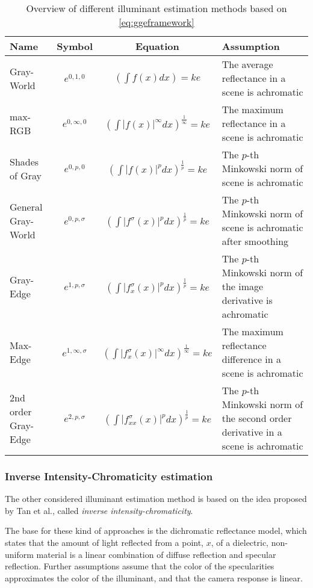 \begin{table}[h!]
\caption{Overview of different illuminant estimation methods based on \ref{eq:ggeframework}}
\centering
\small
\begin{tabular}{l c c p{4.5cm}} 
\hline\hline 
Name & Symbol & Equation & Assumption \\ [0.5ex]
\hline 
Gray-World & $e^{0, 1, 0}$ & $(\int f(x) dx) = k e$ & The average reflectance in a scene is achromatic \\
max-RGB & $e^{0, \infty, 0}$ & $(\int |f(x)|^{\infty} dx)^{\frac{1}{\infty}} = k e$ & The maximum reflectance in a scene is achromatic \\
Shades of Gray & $e^{0, p, 0}$ & $(\int |f(x)|^{p} dx)^{\frac{1}{p}} = k e$ & The $p$-th Minkowski norm of scene is achromatic \\
General Gray-World & $e^{0, p, \sigma}$ & $(\int |f^{\sigma}(x)|^{p} dx)^{\frac{1}{p}} = k e$ & The $p$-th Minkowski norm of scene is achromatic after smoothing\\
Gray-Edge & $e^{1, p, \sigma}$ & $(\int |f^{\sigma}_{x}(x)|^{p} dx)^{\frac{1}{p}} = k e$ & The $p$-th Minkowski norm of the image derivative is achromatic\\
Max-Edge & $e^{1, \infty, \sigma}$ & $(\int |f^{\sigma}_{x}(x)|^{\infty} dx)^{\frac{1}{\infty}} = k e$ & The maximum reflectance difference in a scene is achromatic\\
2nd order Gray-Edge & $e^{2, p, \sigma}$ & $(\int |f^{\sigma}_{xx}(x)|^{p} dx)^{\frac{1}{p}} = k e$ & The $p$-th Minkowski norm of the second order derivative in a scene is achromatic\\ [1ex]
\hline
\end{tabular}
\label{table:ggemethods}
\end{table}

\subsubsection{Inverse Intensity-Chromaticity estimation}

The other considered illuminant estimation method is based on the idea proposed by Tan et al.\cite{tan2004color}, called \emph{inverse intensity-chromaticity}.

The base for these kind of approaches is the dichromatic reflectance model\cite{gholap2008illuminant}, which states that the amount of light reflected from a point, $x$, of a dielectric, non-uniform material is a linear combination of diffuse reflection and specular reflection. Further assumptions assume that the color of the specularities approximates the color of the illuminant, and that the camera response is linear.

